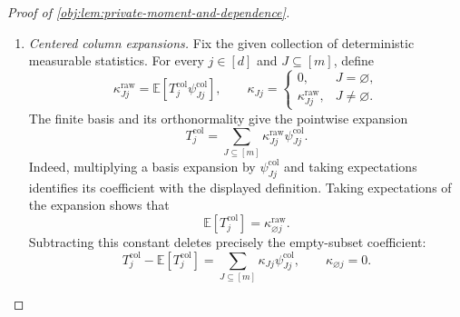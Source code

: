 \documentclass[11pt]{article}
\begin{document}
\begin{proof}[Proof of \cref{obj:lem:private-moment-and-dependence}]
\begin{enumerate}
If \(J\ne J'\), a row in \(J\setminus J'\) or \(J'\setminus J\)
contributes a single centered factor. Factoring over independent rows
therefore gives, for any \(j,j'\in[d]\),
\[
\mathbb E[
\psi^{\mathrm{col}}_{Jj}\psi^{\mathrm{col}}_{J'j'}]=0.
\]
For equal subsets in the same column, row independence instead gives
\[
\mathbb E[(\psi^{\mathrm{col}}_{Jj})^2]
=
\prod_{i\in J}\mathbb E[(\psi^{\mathrm{row}}_{ij})^2]
=
1.
\]
Consequently,
\[
\mathbb E[
\psi^{\mathrm{col}}_{Jj}\psi^{\mathrm{col}}_{J'j}]
=
\begin{cases}
1,&J=J',\\
0,&J\ne J',
\end{cases}
\qquad
\mathbb E[\psi^{\mathrm{col}}_{Jj}]
=
\begin{cases}
1,&J=\varnothing,\\
0,&J\ne\varnothing.
\end{cases}
\]
For each \(j\), these functions of the column are linearly independent by
orthonormality. Their number equals the dimension of the real function
space on the column patterns:
\[
\#\{J:J\subseteq[m]\}
=
2^m
=
\dim_{\mathbb R}\mathbb R^{\{-b,b\}^m}.
\]
They therefore form a basis of that function space.

\item \textit{Centered column expansions.}
Fix the given collection of deterministic measurable statistics.
For every \(j\in[d]\) and \(J\subseteq[m]\), define
\[
\kappa^{\mathrm{raw}}_{Jj}
=
\mathbb E[T_j^{\mathrm{col}}\psi^{\mathrm{col}}_{Jj}],
\qquad
\kappa_{Jj}
=
\begin{cases}
0,&J=\varnothing,\\
\kappa^{\mathrm{raw}}_{Jj},&J\ne\varnothing.
\end{cases}
\]
The finite basis and its orthonormality give the pointwise expansion
\[
T_j^{\mathrm{col}}
=
\sum_{J\subseteq[m]}
\kappa^{\mathrm{raw}}_{Jj}\psi^{\mathrm{col}}_{Jj}.
\]
Indeed, multiplying a basis expansion by
\(\psi^{\mathrm{col}}_{Jj}\) and taking expectations identifies its
coefficient with the displayed definition.
Taking expectations of the expansion shows that
\[
\mathbb E[T_j^{\mathrm{col}}]
=
\kappa^{\mathrm{raw}}_{\varnothing j}.
\]
Subtracting this constant deletes precisely the empty-subset coefficient:
\[
T_j^{\mathrm{col}}-\mathbb E[T_j^{\mathrm{col}}]
=
\sum_{J\subseteq[m]}
\kappa_{Jj}\psi^{\mathrm{col}}_{Jj},
\qquad
\kappa_{\varnothing j}=0.
\]


\end{enumerate}
\end{proof}
\end{document}

